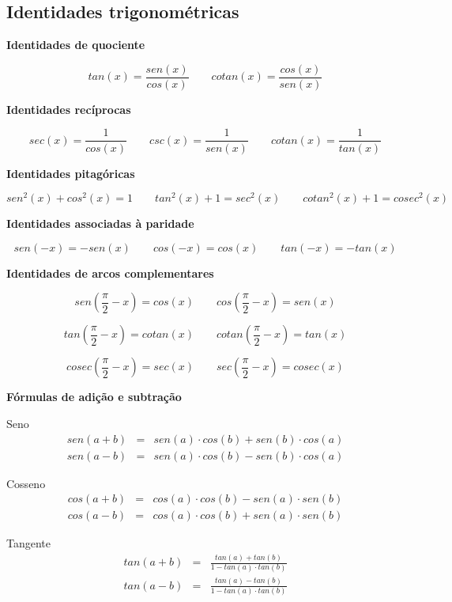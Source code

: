  \newpage

 \subsection{Identidades trigonométricas}
 
 \textbf{Identidades de quociente}
 
 \[tan(x)= \dfrac{sen(x)}{cos(x)} \qquad cotan(x)= \dfrac{cos(x)}{sen(x)}\]
 
 \vskip0.5cm
 \textbf{Identidades recíprocas}
 
 \[sec(x)= \dfrac{1}{cos(x)} \qquad 
   csc(x)= \dfrac{1}{sen(x)} \qquad 
   cotan(x)= \dfrac{1}{tan(x)}\]
 
 \vskip0.5cm
 \textbf{Identidades pitagóricas}
 
 \[sen^2(x) + cos^2(x)= 1 \qquad 
   tan^2(x)+ 1= sec^2(x) \qquad 
   cotan^2(x)+1=cosec^2(x)\]
 
 \vskip0.5cm
 \textbf{Identidades associadas à paridade}
 
 \[sen(-x)= -sen(x) \qquad cos(-x)= cos(x) \qquad tan(-x)=-tan(x)\]
 
 \vskip0.5cm
 \textbf{Identidades de arcos complementares}
 
 \[sen \left(\frac{\pi}{2} - x \right)= cos(x) \qquad 
   cos \left(\frac{\pi}{2} - x \right)= sen(x)\]
 
 \[tan \left(\frac{\pi}{2} - x \right)= cotan(x) \qquad
   cotan \left(\frac{\pi}{2} - x \right)= tan(x)\]
 
 \[cosec \left(\frac{\pi}{2} - x \right)= sec(x) \qquad
   sec \left(\frac{\pi}{2} - x \right)= cosec(x)\]
 

\vskip0.5cm
 \textbf{Fórmulas de adição e subtração}
 
 Seno
 \begin{eqnarray*}
  sen(a+b)&=&sen(a)\cdot cos(b)+sen(b)\cdot cos(a) \\
  sen(a-b)&=&sen(a)\cdot cos(b)-sen(b)\cdot cos(a)
 \end{eqnarray*}
 
 Cosseno
 \begin{eqnarray*}
  cos(a+b)&=&cos(a)\cdot cos(b)-sen(a)\cdot sen(b) \\
  cos(a-b)&=&cos(a)\cdot cos(b)+sen(a)\cdot sen(b)
 \end{eqnarray*}
 
 Tangente
 \begin{eqnarray*}
  tan(a+b)&=& \frac{tan(a)+tan(b)}{1-tan(a)\cdot tan(b)} \\
  tan(a-b)&=& \frac{tan(a)-tan(b)}{1-tan(a)\cdot tan(b)}
 \end{eqnarray*}

